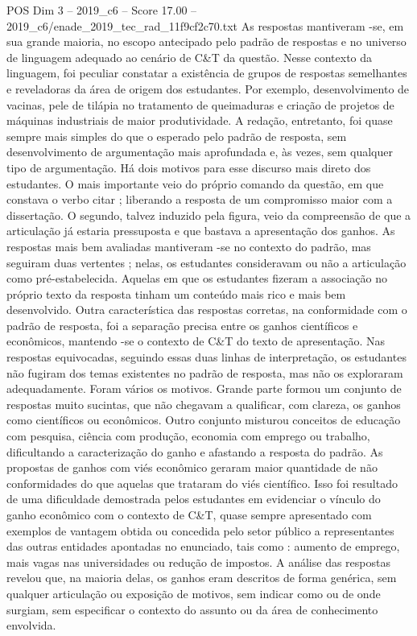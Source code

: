 \begin{textsample}{POS Dim 3 – 2019\_c6 – Score 17.00 – 2019\_c6/enade\_2019\_tec\_rad\_11f9cf2c70.txt}
As respostas mantiveram -se, em sua grande maioria, no escopo antecipado pelo padrão de respostas e no universo de linguagem adequado ao cenário de C\&T da questão.
Nesse contexto da linguagem, foi peculiar constatar a existência de grupos de respostas semelhantes e reveladoras da área de origem dos estudantes.
Por exemplo, desenvolvimento de vacinas, pele de tilápia no tratamento de queimaduras e criação de projetos de máquinas industriais de maior produtividade.
A redação, entretanto, foi quase sempre mais simples do que o esperado pelo padrão de resposta, sem desenvolvimento de argumentação mais aprofundada e, às vezes, sem qualquer tipo de argumentação.
Há dois motivos para esse discurso mais direto dos estudantes.
O mais importante veio do próprio comando da questão, em que constava o verbo citar ; liberando a resposta de um compromisso maior com a dissertação.
O segundo, talvez induzido pela figura, veio da compreensão de que a articulação já estaria pressuposta e que bastava a apresentação dos ganhos.
As respostas mais bem avaliadas mantiveram -se no contexto do padrão, mas seguiram duas vertentes ; nelas, os estudantes consideravam ou não a articulação como pré-estabelecida.
Aquelas em que os estudantes fizeram a associação no próprio texto da resposta tinham um conteúdo mais rico e mais bem desenvolvido.
Outra característica das respostas corretas, na conformidade com o padrão de resposta, foi a separação precisa entre os ganhos científicos e econômicos, mantendo -se o contexto de C\&T do texto de apresentação.
Nas respostas equivocadas, seguindo essas duas linhas de interpretação, os estudantes não fugiram dos temas existentes no padrão de resposta, mas não os exploraram adequadamente.
Foram vários os motivos.
Grande parte formou um conjunto de respostas muito sucintas, que não chegavam a qualificar, com clareza, os ganhos como científicos ou econômicos.
Outro conjunto misturou conceitos de educação com pesquisa, ciência com produção, economia com emprego ou trabalho, dificultando a caracterização do ganho e afastando a resposta do padrão.
As propostas de ganhos com viés econômico geraram maior quantidade de não conformidades do que aquelas que trataram do viés científico.
Isso foi resultado de uma dificuldade demostrada pelos estudantes em evidenciar o vínculo do ganho econômico com o contexto de C\&T, quase sempre apresentado com exemplos de vantagem obtida ou concedida pelo setor público a representantes das outras entidades apontadas no enunciado, tais como : aumento de emprego, mais vagas nas universidades ou redução de impostos.
A análise das respostas revelou que, na maioria delas, os ganhos eram descritos de forma genérica, sem qualquer articulação ou exposição de motivos, sem indicar como ou de onde surgiam, sem especificar o contexto do assunto ou da área de conhecimento envolvida.

\end{textsample}
